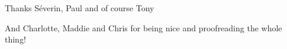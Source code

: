 Thanks S\'{e}verin, Paul and of course Tony

And Charlotte, Maddie and Chris for being nice and proofreading the whole thing!
